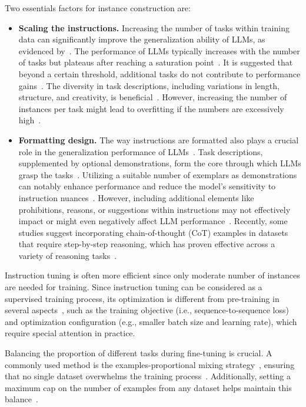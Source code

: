 Two essentials factors for instance construction are:
\begin{itemize}
	\item \textbf{Scaling the instructions.} {Increasing the number of tasks within training data can significantly improve the generalization ability of LLMs, as evidenced by~\textcite{wei2022fine, sanh2021distilbert, chowdhery2022palm}. The performance of LLMs typically increases with the number of tasks but plateaus after reaching a saturation point~\cite{raffel2023exploring, chowdhery2022palm}. It is suggested that beyond a certain threshold, additional tasks do not contribute to performance gains~\cite{raffel2023exploring}. The diversity in task descriptions, including variations in length, structure, and creativity, is beneficial~\cite{wei2022fine}. However, increasing the number of instances per task might lead to overfitting if the numbers are excessively high~\cite{chowdhery2022palm, chen2023maybe}.}
	\item \textbf{Formatting design.} {
		      The way instructions are formatted also plays a crucial role in the generalization performance of LLMs~\cite{chowdhery2022palm}. Task descriptions, supplemented by optional demonstrations, form the core through which LLMs grasp the tasks~\cite{chowdhery2022palm}. Utilizing a suitable number of exemplars as demonstrations can notably enhance performance and reduce the model's sensitivity to instruction nuances~\cite{sanh2021distilbert, raffel2023exploring}. However, including additional elements like prohibitions, reasons, or suggestions within instructions may not effectively impact or might even negatively affect LLM performance~\cite{chowdhery2022palm, mishra2022crosstask}. Recently, some studies suggest incorporating chain-of-thought (CoT) examples in datasets that require step-by-step reasoning, which has proven effective across a variety of reasoning tasks~\cite{raffel2023exploring, iyer2022opt}.
	      }
\end{itemize}

Instruction tuning is often more efficient since only moderate number of instances are needed for training.
Since instruction tuning can be considered as a supervised training process, its optimization is different from pre-training in several aspects~\cite{chung2022scaling}, such as the training objective (i.e., sequence-to-sequence loss) and optimization
configuration (e.g., smaller batch size and learning rate), which require special attention in practice.

Balancing the proportion of different tasks during fine-tuning is crucial.
A commonly used method is the examples-proportional mixing strategy~\cite{raffel2023exploring}, ensuring that no single dataset overwhelms the training process~\cite{raffel2023exploring, wei2022fine}.
Additionally, setting a maximum cap on the number of examples from any dataset helps maintain this balance~\cite{raffel2023exploring, wei2022fine}.

